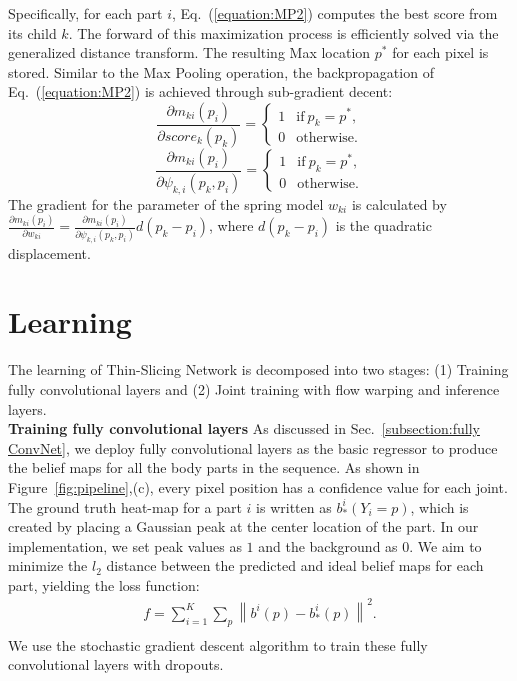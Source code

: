 \documentclass[10pt,twocolumn,letterpaper]{article}
\newcommand{\figref}[1]{Figure~\ref{#1}}
\newcommand{\secref}[1]{Sec.~\ref{#1}}
\newcommand{\refequ}[1]{Eq.~(\ref{#1})}
\begin{document}
Specifically, for each part $i$, \refequ{equation:MP2} computes the best score from its child $k$. The forward of this maximization process is efficiently solved via the generalized distance transform. The resulting Max location $p^*$ for each pixel is stored. Similar to the Max Pooling operation, the backpropagation of \refequ{equation:MP2} is achieved through sub-gradient decent:
\begin{displaymath}
\frac{\partial m_{ki}(p_i)}{\partial score_k(p_k)} = \left\{ \begin{array}{cc}
1 & \mathrm{if} \ p_k = p^*, \\
0 & \mathrm{otherwise}.
\end{array}
\right.
\end{displaymath}\begin{displaymath}
\frac{\partial m_{ki}(p_i)}{\partial \psi_{k,i}(p_k, p_i)} = \left\{ \begin{array}{cc}
1 & \mathrm{if} \ p_k = p^*, \\
0 & \mathrm{otherwise}.
\end{array}
\right.
\end{displaymath}
The gradient for the parameter of the spring model $w_{ki}$ is calculated by $\frac{\partial m_{ki}(p_i)}{\partial w_{ki}} = \frac{\partial m_{ki}(p_i)}{\partial \psi_{k,i}(p_k, p_i)}d(p_k-p_i)$, where $d(p_k-p_i)$ is the quadratic displacement.

\section{Learning}
The learning of Thin-Slicing Network is decomposed into two stages: (1) Training fully convolutional layers and (2) Joint training with flow warping and inference layers. \\

\noindent\textbf{Training fully convolutional layers}%
As discussed in \secref{subsection:fully ConvNet}, we deploy fully convolutional layers as the basic regressor to produce the belief maps for all the body parts in the sequence. As shown in \figref{fig:pipeline},(c), every pixel position has a confidence value for each joint. The ground truth heat-map for a part $i$ is written as $b_{\ast}^i(Y_i = p)$, which is created by placing a Gaussian peak at the center location of the part. In our implementation, we set peak values as $1$ and the background as $0$. We aim to minimize the $l_2$ distance between the predicted and ideal belief maps for each part, yielding the loss function:
\begin{equation}
\begin{aligned}
f = \sum_{i=1}^K\sum_{p}\left \|  b^i(p)-b_{\ast}^i(p) \right \|^2.\\
\end{aligned}
\label{equation:stage1}
\end{equation}
We use the stochastic gradient descent algorithm to train these fully convolutional layers with dropouts.\\
\end{document}
